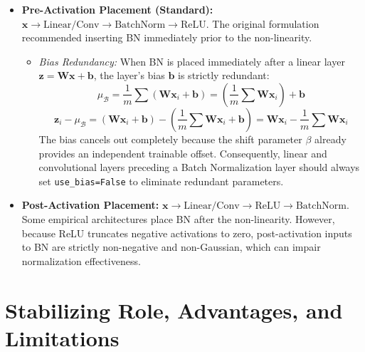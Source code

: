 \documentclass[12pt,a4paper]{article}
\begin{document}
\begin{itemize}[leftmargin=*]
    \item \textbf{Pre-Activation Placement (Standard):} $\mathbf{x} \to \text{Linear/Conv} \to \text{BatchNorm} \to \text{ReLU}$. The original formulation recommended inserting BN immediately prior to the non-linearity. 
    \begin{itemize}
        \item \textit{Bias Redundancy:} When BN is placed immediately after a linear layer $\mathbf{z} = \mathbf{W}\mathbf{x} + \mathbf{b}$, the layer's bias $\mathbf{b}$ is strictly redundant:
        \[
        \mu_{\mathcal{B}} = \frac{1}{m}\sum (\mathbf{W}\mathbf{x}_i + \mathbf{b}) = \left(\frac{1}{m}\sum \mathbf{W}\mathbf{x}_i\right) + \mathbf{b}
        \]
        \[
        \mathbf{z}_i - \mu_{\mathcal{B}} = (\mathbf{W}\mathbf{x}_i + \mathbf{b}) - \left(\frac{1}{m}\sum \mathbf{W}\mathbf{x}_i + \mathbf{b}\right) = \mathbf{W}\mathbf{x}_i - \frac{1}{m}\sum \mathbf{W}\mathbf{x}_i
        \]
        The bias cancels out completely because the shift parameter $\beta$ already provides an independent trainable offset. Consequently, linear and convolutional layers preceding a Batch Normalization layer should always set \texttt{use\_bias=False} to eliminate redundant parameters.
    \end{itemize}
    \item \textbf{Post-Activation Placement:} $\mathbf{x} \to \text{Linear/Conv} \to \text{ReLU} \to \text{BatchNorm}$. Some empirical architectures place BN after the non-linearity. However, because ReLU truncates negative activations to zero, post-activation inputs to BN are strictly non-negative and non-Gaussian, which can impair normalization effectiveness.
\end{itemize}

\section{Stabilizing Role, Advantages, and Limitations}
\end{document}
